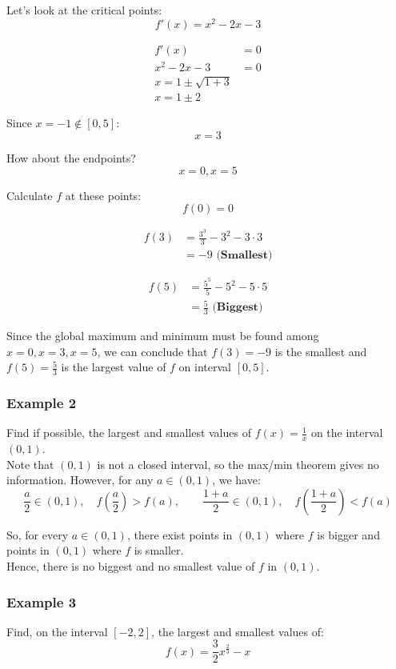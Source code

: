 \documentclass[11pt]{article}
\begin{document}
Let's look at the critical points:
\[f'(x) = x^2 - 2x - 3\]

\begin{align*}
f'(x) &= 0 \\
x^2 - 2x - 3 &= 0 \\
x = 1 \pm \sqrt{1 + 3} \\
x = 1 \pm 2
\end{align*}

Since \(x = -1 \notin [0, 5]\):
\[x = 3\]

How about the endpoints?
\[x = 0, x = 5\]

Calculate \(f\) at these points:
\[f(0) = 0\]

\begin{align*}
f(3) &= \frac{3^3}{3} - 3^2 - 3 \cdot 3 \\
&= -9 \textbf{ (Smallest)}
\end{align*}

\begin{align*}
f(5) &= \frac{5^5}{5} - 5^2 - 5 \cdot 5 \\
&= \frac{5}{3} \textbf{ (Biggest)}
\end{align*}

Since the global maximum and minimum must be found among \(x = 0, x = 3, x = 5\), we can conclude that \(f(3) = -9\) is the smallest and \(f(5) = \frac{5}{3}\) is the largest value of \(f\) on interval \([0, 5]\).

\subsubsection{Example 2}
\label{sec:org0074875}
Find if possible, the largest and smallest values of \(f(x) = \frac{1}{x}\) on the interval \((0, 1)\).
\\[0pt]

Note that \((0, 1)\) is not a closed interval, so the max/min theorem gives no information. However, for any \(a \in (0, 1)\), we have:
\[\frac{a}{2} \in (0, 1), \quad f \left(\frac{a}{2} \right) > f(a), \qquad \frac{1 + a}{2} \in (0, 1), \quad f \left(\frac{1 + a}{2} \right) < f(a)\]

So, for every \(a \in (0, 1)\), there exist points in \((0, 1)\) where \(f\) is bigger and points in \((0, 1)\) where \(f\) is smaller.
\\[0pt]

Hence, there is no biggest and no smallest value of \(f\) in \((0, 1)\).

\newpage

\subsubsection{Example 3}
\label{sec:org2464082}
Find, on the interval \([-2, 2]\), the largest and smallest values of:
\[f(x) = \frac{3}{2} x^{\frac{2}{3}} - x\]
\end{document}
